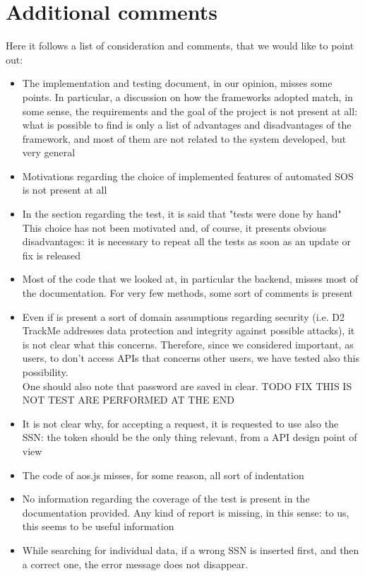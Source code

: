 \section{Additional comments}
Here it follows a list of consideration and comments, that we would like to point out:
\begin{itemize}
\item The implementation and testing document, in our opinion, misses some points. 
In particular, a discussion on how the frameworks adopted match, in some sense, the requirements and the goal of the project 
is not present at all: what is possible to find is only a list of advantages and disadvantages of the framework, and most of them are not
related to the system developed, but very general
\item Motivations regarding the choice of implemented features of automated SOS is not present at all
\item In the section regarding the test, it is said that "tests were done by hand"
This choice has not been motivated and, of course, it presents obvious disadvantages: it is necessary to repeat all the tests as soon as
an update or fix is released
\item Most of the code that we looked at, in particular the backend, misses most of the documentation. For very few methods, some sort
of comments is present
\item Even if is present a sort of domain assumptions regarding security (i.e. D2 TrackMe addresses data protection and integrity against
possible attacks), it is not clear what this concerns. Therefore, since we considered important, as users, to don't access APIs that
concerns other users, we have tested also this possibility. \\
One should also note that password are saved in clear.
TODO FIX THIS IS NOT TEST ARE PERFORMED AT THE END 
\item It is not clear why, for accepting a request, it is requested to use also the SSN: the token should be the only thing relevant, from a
API design point of view
\item The code of aos.js misses, for some reason, all sort of indentation
\item No information regarding the coverage of the test is present in the documentation provided. 
Any kind of report is missing, in this sense: to us, this seems to be useful information
\item While searching for individual data, if a wrong SSN is inserted first, and then 
a correct one, the error message does not disappear. 


\end{itemize}
